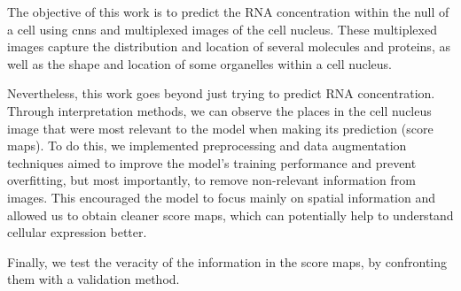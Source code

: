 
\glsresetall

The objective of this work is to predict the RNA concentration within the null of a cell using \glspl{cnn} and multiplexed images of the cell nucleus. These multiplexed images capture the distribution and location of several molecules and proteins, as well as the shape and location of some organelles within a cell nucleus.

Nevertheless, this work goes beyond just trying to predict RNA concentration. Through interpretation methods, we can observe the places in the cell nucleus image that were most relevant to the model when making its prediction (score maps). To do this, we implemented preprocessing and data augmentation techniques aimed to improve the model's training performance and prevent overfitting, but most importantly, to remove non-relevant information from images. This encouraged the model to focus mainly on spatial information and allowed us to obtain cleaner score maps, which can potentially help to understand cellular expression better. 

Finally, we test the veracity of the information in the score maps, by confronting them with a validation method.
